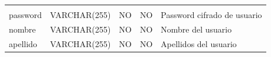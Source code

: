 \documentclass[12pt,a4paperpaper,]{report}
\begin{document}
\begin{longtable}[]{@{}lllll@{}}
\begin{minipage}[t]{0.15\columnwidth}
\end{minipage}\tabularnewline
\begin{minipage}[t]{0.20\columnwidth}\raggedright\strut
password\strut
\end{minipage} & \begin{minipage}[t]{0.18\columnwidth}\raggedright\strut
VARCHAR(255)\strut
\end{minipage} & \begin{minipage}[t]{0.15\columnwidth}\raggedright\strut
NO\strut
\end{minipage} & \begin{minipage}[t]{0.18\columnwidth}\raggedright\strut
NO\strut
\end{minipage} & \begin{minipage}[t]{0.15\columnwidth}\raggedright\strut
Password cifrado de usuario\strut
\end{minipage}\tabularnewline
\begin{minipage}[t]{0.20\columnwidth}\raggedright\strut
nombre\strut
\end{minipage} & \begin{minipage}[t]{0.18\columnwidth}\raggedright\strut
VARCHAR(255)\strut
\end{minipage} & \begin{minipage}[t]{0.15\columnwidth}\raggedright\strut
NO\strut
\end{minipage} & \begin{minipage}[t]{0.18\columnwidth}\raggedright\strut
NO\strut
\end{minipage} & \begin{minipage}[t]{0.15\columnwidth}\raggedright\strut
Nombre del usuario\strut
\end{minipage}\tabularnewline
\begin{minipage}[t]{0.20\columnwidth}\raggedright\strut
apellido\strut
\end{minipage} & \begin{minipage}[t]{0.18\columnwidth}\raggedright\strut
VARCHAR(255)\strut
\end{minipage} & \begin{minipage}[t]{0.15\columnwidth}\raggedright\strut
NO\strut
\end{minipage} & \begin{minipage}[t]{0.18\columnwidth}\raggedright\strut
NO\strut
\end{minipage} & \begin{minipage}[t]{0.15\columnwidth}\raggedright\strut
Apellidos del usuario\strut
\end{minipage}\tabularnewline

\end{longtable}
\end{document}
